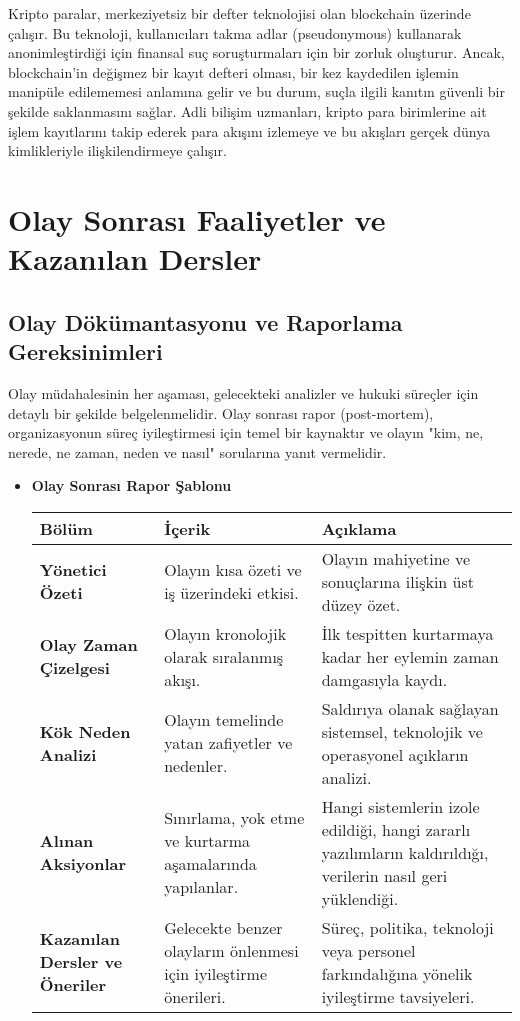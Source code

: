 Kripto paralar, merkeziyetsiz bir defter teknolojisi olan blockchain üzerinde çalışır. Bu teknoloji, kullanıcıları takma adlar (pseudonymous) kullanarak anonimleştirdiği için finansal suç soruşturmaları için bir zorluk oluşturur. Ancak, blockchain'in değişmez bir kayıt defteri olması, bir kez kaydedilen işlemin manipüle edilememesi anlamına gelir ve bu durum, suçla ilgili kanıtın güvenli bir şekilde saklanmasını sağlar. Adli bilişim uzmanları, kripto para birimlerine ait işlem kayıtlarını takip ederek para akışını izlemeye ve bu akışları gerçek dünya kimlikleriyle ilişkilendirmeye çalışır.

\section{Olay Sonrası Faaliyetler ve Kazanılan Dersler}

\subsection{Olay Dökümantasyonu ve Raporlama Gereksinimleri}

Olay müdahalesinin her aşaması, gelecekteki analizler ve hukuki süreçler için detaylı bir şekilde belgelenmelidir. Olay sonrası rapor (post-mortem), organizasyonun süreç iyileştirmesi için temel bir kaynaktır ve olayın "kim, ne, nerede, ne zaman, neden ve nasıl" sorularına yanıt vermelidir.

\begin{itemize}
    \item \textbf{Olay Sonrası Rapor Şablonu}
    \begin{tabular}{|l|l|l|}
    \hline
    \textbf{Bölüm} & \textbf{İçerik} & \textbf{Açıklama} \\
    \hline
    \textbf{Yönetici Özeti} & Olayın kısa özeti ve iş üzerindeki etkisi. & Olayın mahiyetine ve sonuçlarına ilişkin üst düzey özet. \\
    \hline
    \textbf{Olay Zaman Çizelgesi} & Olayın kronolojik olarak sıralanmış akışı. & İlk tespitten kurtarmaya kadar her eylemin zaman damgasıyla kaydı. \\
    \hline
    \textbf{Kök Neden Analizi} & Olayın temelinde yatan zafiyetler ve nedenler. & Saldırıya olanak sağlayan sistemsel, teknolojik ve operasyonel açıkların analizi. \\
    \hline
    \textbf{Alınan Aksiyonlar} & Sınırlama, yok etme ve kurtarma aşamalarında yapılanlar. & Hangi sistemlerin izole edildiği, hangi zararlı yazılımların kaldırıldığı, verilerin nasıl geri yüklendiği. \\
    \hline
    \textbf{Kazanılan Dersler ve Öneriler} & Gelecekte benzer olayların önlenmesi için iyileştirme önerileri. & Süreç, politika, teknoloji veya personel farkındalığına yönelik iyileştirme tavsiyeleri. \\
    \hline
    \end{tabular}
\end{itemize}

